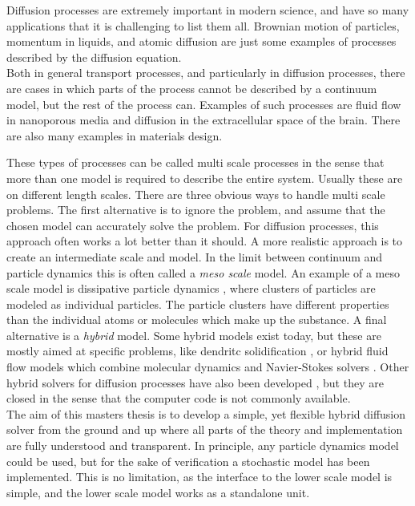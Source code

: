 Diffusion processes are extremely important in modern science, and have so many applications that it is challenging to list them all. 
Brownian motion of particles, momentum in liquids, and atomic diffusion are just some examples of processes described by the diffusion equation. \\
\noindent Both in general transport processes, and particularly in diffusion processes, there are cases in which parts of the process cannot be described by a continuum model, but the rest of the process can. 
Examples of such processes are fluid flow in nanoporous media and diffusion in the extracellular space of the brain. There are also many examples in materials design.

\noindent These types of processes can be called multi scale processes in the sense that more than one model is required to describe the entire system. Usually these are on different length scales. 
There are three obvious ways to handle multi scale problems. 
The first alternative is to ignore the problem, and assume that the chosen model can accurately solve the problem. For diffusion processes, this approach often works a lot better than it should. 
A more realistic approach is to create an intermediate scale and model. In the limit between continuum and particle dynamics this is often called a \emph{meso scale} model. 
An example of a meso scale model is dissipative particle dynamics \cite{warren1998dissipative}, where clusters of particles are modeled as individual particles. The particle clusters have different properties than the individual atoms or molecules which make up the substance. 
A final alternative is a \emph{hybrid} model.
Some hybrid models exist today, but these are mostly aimed at specific problems, like dendritc solidification \cite{plapp2000multiscale}, or hybrid fluid flow models which combine molecular dynamics and Navier-Stokes solvers \cite{o1995molecular}. 
Other hybrid solvers for diffusion processes have also been developed \cite{flekkoy2001coupling}, but they are closed in the sense that the computer code is not commonly available. \\

\noindent The aim of this masters thesis is to develop a simple, yet flexible hybrid diffusion solver from the ground and up where all parts of the theory and implementation are fully understood and transparent. 
In principle, any particle dynamics model could be used, but for the sake of verification a stochastic model has been implemented. 
This is no limitation, as the interface to the lower scale model is simple, and the lower scale model works as a standalone unit. \\

